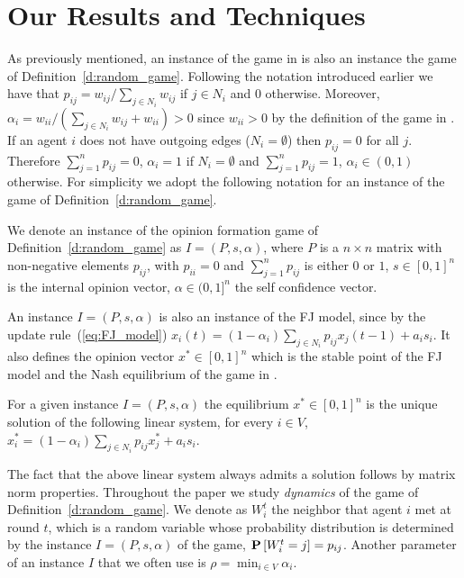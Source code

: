 \section{Our Results and Techniques}\label{s:results}
As previously mentioned, an instance of the game in \cite{BKO11}
is also an instance the game of Definition~\ref{d:random_game}.
Following the notation introduced earlier we have that
$p_{ij} = w_{ij}/\sum_{j \in N_i}w_{ij}$ if $j \in N_i$ and $0$ otherwise.
Moreover, $\alpha_i=w_{ii}/(\sum_{j \in N_i}w_{ij}+w_{ii})>0$ since $w_{ii}>0$
by the definition of the game in \cite{BKO11}.
If an agent $i$ does not have outgoing edges ($N_i = \emptyset$) then
$p_{ij} = 0$ for all $j$. Therefore $\sum_{j=1}^n p_{ij}=0$, $\alpha_i=1$ if $N_i= \emptyset$
and $\sum_{j=1}^n p_{ij}=1$, $\alpha_i \in (0,1)$ otherwise.
For simplicity we adopt the following notation for
an instance of the game of Definition~\ref{d:random_game}.
%
\begin{definition}\label{d:instance}
  We denote an instance of the opinion formation game of Definition~\ref{d:random_game}
  as $I=(P,s,\alpha)$, where
    $P$ is a $n \times n$  matrix with non-negative elements $p_{ij}$,
      with $p_{ii}=0$ and $\sum_{j=1}^n p_{ij}$ is either $0$ or $1$,
    $s \in [0,1]^n$ is the internal opinion vector,
    $\alpha \in (0,1]^n$ the self confidence vector.
\end{definition}
%

An instance $I=(P,s,\alpha)$ is also an instance
of the FJ model, since by the update rule~(\ref{eq:FJ_model})
$x_i(t)=(1-\alpha_i)\sum_{j \in N_i}p_{ij}x_j(t-1) + a_i s_i$.
It also defines the opinion vector $x^* \in [0,1]^n$ which is the
stable point of the FJ model and the Nash equilibrium
of the game in \cite{BKO11}.
\begin{definition}
For a given instance $I=(P,s,\alpha)$ the equilibrium
$x^*\in [0,1]^n$ is the unique solution of the following linear system,
for every $i \in V$, $x^*_i=(1-\alpha_i)\sum_{j \in N_i}p_{ij}x_j^* + a_i s_i$.
\end{definition}
The fact that the above linear system always admits a solution follows
by matrix norm properties.
Throughout the paper we study \emph{dynamics} of the game of
Definition~\ref{d:random_game}.  We denote as $W_i^t$ the neighbor that agent $i$
met at round $t$, which is a random variable whose probability distribution is
determined by the instance $I=(P,s,\alpha)$ of the game, $\bm{\mathrm{P}}\left[W_i^t=j\right]=p_{ij}$.
Another parameter of an instance $I$ that we often use is
$\rho=\min_{i \in V}\alpha_i$.

